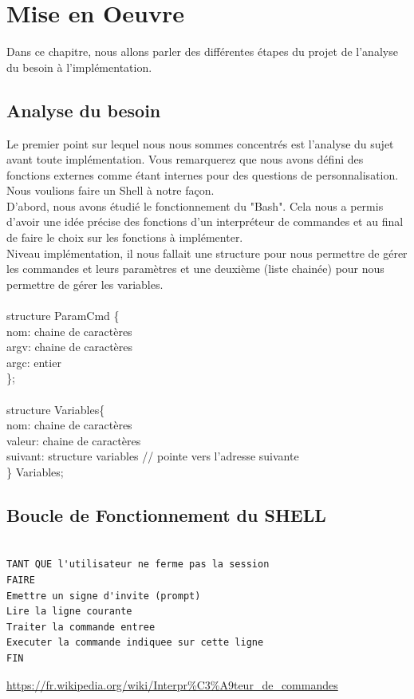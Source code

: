 \chapter{Mise en Oeuvre}

Dans ce chapitre, nous allons parler des différentes étapes du projet de l'analyse du besoin à l'implémentation.

\section{Analyse du besoin}

Le premier point sur lequel nous nous sommes concentrés est l'analyse du sujet avant toute implémentation. 
Vous remarquerez que nous avons défini des fonctions externes comme étant internes pour des questions de personnalisation. Nous voulions faire un Shell à notre façon. 
\\D'abord, nous avons étudié le fonctionnement du "Bash". Cela nous a permis d'avoir une idée précise des fonctions d'un interpréteur de commandes et au final de faire le choix sur les fonctions à implémenter.
\\Niveau implémentation, il nous fallait une structure pour nous permettre de gérer les commandes et leurs paramètres et une deuxième (liste chainée) pour nous permettre de gérer les variables.
\\
{\selectfont 
\\structure ParamCmd \{
\\  nom: chaine de caractères 
\\  argv: chaine de caractères
\\  argc: entier
\\\};
}
\\
{\selectfont 
\\ structure Variables\{
\\   nom: chaine de caractères
\\   valeur: chaine de caractères
\\   suivant: structure variables // pointe vers l'adresse suivante
\\\} Variables;
}
\newpage
\section{Boucle de Fonctionnement du SHELL}
{\selectfont 
\begin{lstlisting}[frame=single]

TANT QUE l'utilisateur ne ferme pas la session
FAIRE
Emettre un signe d'invite (prompt)
Lire la ligne courante
Traiter la commande entree
Executer la commande indiquee sur cette ligne
FIN 

\end{lstlisting}

}
\url{https://fr.wikipedia.org/wiki/Interpr\%C3\%A9teur\_de\_commandes}
